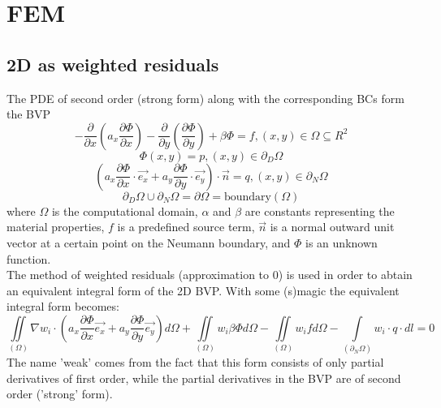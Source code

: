 \section{FEM}

\subsection{2D as weighted residuals}
The PDE of second order (strong form) along with the corresponding BCs form the BVP
\begin{equation*}
	-\frac{\partial }{\partial x}\left(a_x \frac{\partial \Phi}{\partial x}\right) - \frac{\partial }{\partial y}\left(\frac{\partial \Phi}{\partial y}\right) + \beta \Phi = f, (x,y) \in \Omega \subseteq R^2
\end{equation*}
\begin{equation*}
	\Phi(x,y) = p, (x,y) \in \partial_D\Omega
\end{equation*}
\begin{equation*}
	\left(a_x \frac{\partial \Phi}{\partial x}\cdot \vec{e_x} + a_y \frac{\partial \Phi}{\partial y} \cdot \vec{e_y}\right) \cdot \vec{n} = q, (x,y) \in \partial_N\Omega
\end{equation*}
\begin{equation*}
	\partial_D\Omega \cup \partial_N\Omega = \partial\Omega = \textrm{boundary}(\Omega)
\end{equation*}
where $\Omega$ is the computational domain, $\alpha$ and $\beta$ are constants representing the material properties, $f$ is a predefined source term, $\vec{n}$ is a normal outward unit vector at a certain point on the Neumann boundary, and $\Phi$ is an unknown function. \\

The method of weighted residuals (approximation to $0$) is used in order to abtain an equivalent integral form of the 2D BVP. With some (s)magic the equivalent integral form becomes:
\begin{equation*}
	\iint\limits_{\left(\Omega\right)} \nabla w_i \cdot \left(a_x \frac{\partial \Phi}{\partial x} \vec{e_x} + a_y \frac{\partial \Phi}{\partial y} \vec{e_y}\right) d\Omega + \iint\limits_{\left(\Omega\right)} w_i\beta\Phi d\Omega - \iint\limits_{\left(\Omega\right)} w_i f d\Omega  - \int\limits_{\left(\partial_N\Omega\right)} w_i \cdot q \cdot dl = 0
\end{equation*}
The name 'weak' comes from the fact that this form consists of only partial derivatives of first order, while the partial derivatives in the BVP are of second order ('strong' form).


